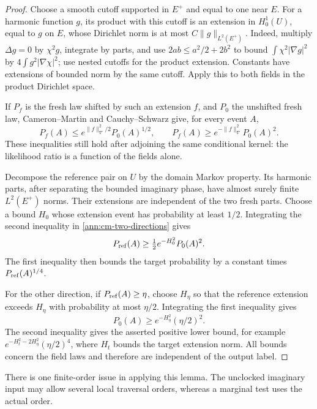\begin{proof}
Choose a smooth cutoff supported in \(E^+\) and equal to one near
\(E\).  For a harmonic function \(g\), its product with this cutoff
is an extension in \(H^1_0(U)\), equal to \(g\) on \(E\), whose
Dirichlet norm is at most \(C\|g\|_{L^2(E^+)}\).
Indeed, multiply \(\Delta g=0\) by \(\chi^2g\), integrate by parts,
and use \(2ab\le a^2/2+2b^2\) to bound
\(\int\chi^2|\nabla g|^2\) by
\(4\int g^2|\nabla\chi|^2\); use nested cutoffs for the product
extension.  Constants have extensions of bounded norm by the same
cutoff.  Apply this to both fields in the product Dirichlet space.

If \(P_f\) is the fresh law shifted by such an extension \(f\),
and \(P_0\) the unshifted fresh law, Cameron--Martin and
Cauchy--Schwarz give, for every event \(A\),
\begin{equation}
 P_f(A)\le e^{\|f\|_\nabla^2/2}P_0(A)^{1/2},
 \qquad
 P_f(A)\ge e^{-\|f\|_\nabla^2}P_0(A)^2.
 \label{ann:cm-two-directions}
\end{equation}
These inequalities still hold after adjoining the same conditional
kernel: the likelihood ratio is a function of the fields alone.

Decompose the reference pair on \(U\) by the domain Markov property.
Its harmonic parts, after separating the bounded imaginary phase,
have almost surely finite \(L^2(E^+)\) norms.  Their extensions are
independent of the two fresh parts.  Choose a bound \(H_0\) whose
extension event has probability at least \(1/2\).  Integrating the
second inequality in \eqref{ann:cm-two-directions} gives
\[
 P_{\rm ref}(A)\ge\tfrac12e^{-H_0^2}P_0(A)^2.
\]
The first inequality then bounds the target probability by a constant
times \(P_{\rm ref}(A)^{1/4}\).

For the other direction, if \(P_{\rm ref}(A)\ge\eta\), choose
\(H_\eta\) so that the reference extension exceeds \(H_\eta\)
with probability at most \(\eta/2\).  Integrating the first
inequality gives
\[
 P_0(A)\ge e^{-H_\eta^2}(\eta/2)^2.
\]
The second inequality gives the asserted positive lower bound,
for example \(e^{-H_t^2-2H_\eta^2}(\eta/2)^4\), where \(H_t\)
bounds the target extension norm.  All bounds concern the field
laws and therefore are independent of the output label.
\end{proof}

There is one finite-order issue in applying this lemma.  The
unclocked imaginary input may allow several local traversal orders,
whereas a marginal test uses the actual order.

